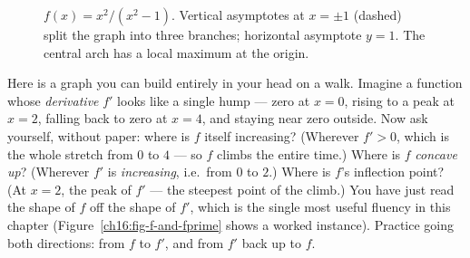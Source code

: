 \begin{figure}[H]
\centering
{}
\caption{$f(x)=x^2/(x^2-1)$. Vertical asymptotes at $x=\pm1$ (dashed) split the
graph into three branches; horizontal asymptote $y=1$. The central arch has a local
maximum at the origin.}
\label{ch16:fig-rational}
\end{figure}

\begin{walkbox}
Here is a graph you can build entirely in your head on a walk. Imagine a function
whose \emph{derivative} $f'$ looks like a single hump --- zero at $x=0$, rising to a
peak at $x=2$, falling back to zero at $x=4$, and staying near zero outside. Now ask
yourself, without paper: where is $f$ itself increasing? (Wherever $f'>0$, which is
the whole stretch from $0$ to $4$ --- so $f$ climbs the entire time.) Where is $f$
\emph{concave up}? (Wherever $f'$ is \emph{increasing}, i.e.\ from $0$ to $2$.)
Where is $f$'s inflection point? (At $x=2$, the peak of $f'$ --- the steepest point
of the climb.) You have just read the shape of $f$ off the shape of $f'$, which is
the single most useful fluency in this chapter (Figure~\ref{ch16:fig-f-and-fprime}
shows a worked instance). Practice going both directions: from
$f$ to $f'$, and from $f'$ back up to $f$.
\end{walkbox}

